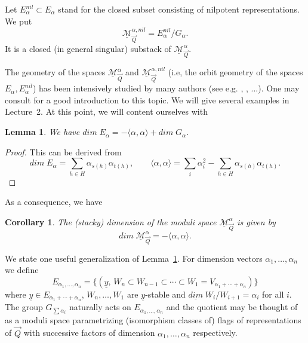 \documentclass[a4paper,10pt]{amsart}
\def\a{\alpha}
\def\Ma{\underline{\mathcal{M}}^{\alpha}_{\vec{Q}}}
\newtheorem{lem}[theo]{Lemma}
\newtheorem{cor}[theo]{Corollary}
\numberwithin{equation}{section}
\begin{document}
\vspace{.1in}

Let $E_{\alpha}^{nil} \subset E_{\alpha}$ stand for the closed subset consisting of nilpotent representations. We put
\begin{equation}\label{E:12}
\underline{\mathcal{M}}^{\alpha,nil}_{\vec{Q}}=E^{nil}_{\alpha}/G_{\alpha}.
\end{equation}
It is a closed (in general singular) substack of $\underline{\mathcal{M}}^{\alpha}_{\vec{Q}}$. 

\vspace{.1in}

The geometry of the spaces $\underline{\mathcal{M}}^{\alpha}_{\vec{Q}}$ and $\underline{\mathcal{M}}^{\alpha,nil}_{\vec{Q}}$ (i.e, the orbit geometry of the spaces $E_{\alpha}, E_{\alpha}^{nil}$) has been intensively studied by many authors (see e.g. \cite{Bongartz}, \cite{Kraft-Erdmann}, \cite{Zwara} ...). One may consult \cite{CrawleyNotes} for a good introduction to this topic. We will give several examples  in Lecture~2. At this point, we will content ourselves with

\vspace{.1in}

\begin{lem}\label{L:dim} We have $dim\;E_{\alpha}=-\langle\alpha,\alpha \rangle + dim\;G_{\alpha}.$
\end{lem}
\begin{proof} This can be derived from
$$dim\;E_{\alpha}=\sum_{h \in H} \alpha_{s(h)} \alpha_{t(h)}, \qquad
\langle \alpha, \alpha \rangle =\sum_i \alpha_i^2-\sum_{h \in H} \alpha_{s(h)} \alpha_{t(h)}.$$
\end{proof}

\vspace{.1in}

As a consequence, we have

\vspace{.1in}

\begin{cor} The (stacky) dimension of the moduli space $\Ma$ is given by 
\begin{equation}\label{E:101}
dim\;\Ma=-\langle \alpha, \alpha \rangle.
\end{equation}
\end{cor}

\vspace{.1in}

We state one useful generalization of Lemma~\ref{L:dim}. For dimension vectors $\a_1, \ldots, \a_n$ we define
$$E_{\a_1, \ldots, \a_n}=\big\{ (\underline{y},\, W_n \subset W_{n-1} \subset \cdots \subset W_1=V_{ \a_1+ \cdots + \a_n})\big\}$$
where $\underline{y} \in E_{\a_1 + \cdots + \a_n}$, $W_n, \ldots, W_1$ are $\underline{y}$-stable and $\underline{dim}\; W_{i}/W_{i+1}=\a_i$ for all $i$.
The group $G_{\sum \a_i}$ naturally acts on $E_{\a_1, \ldots, \a_n}$ and the quotient may be thought of as a moduli space parametrizing (isomorphism classes of) flags of 
representations of $\vec{Q}$ with successive factors of dimension $\a_1, \ldots, \a_n$ respectively.
\end{document}
